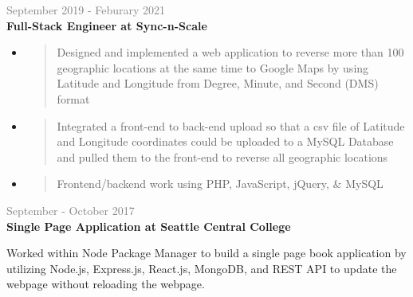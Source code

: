 \documentclass[letterpage]{article}
\begin{document}
\begin{minipage}[t]{0.61\linewidth}
\vspace{7px}
\textcolor{gray}{September 2019 - Feburary 2021}\\
\textbf{\textsf{Full-Stack Engineer at Sync-n-Scale}}
\begin{itemize}[leftmargin=*,labelindent=1mm,labelsep=0mm]
\item
  \begin{quote}
  \raggedright
  Designed and implemented a web application to reverse more than 100 geographic locations at the same time to Google Maps by using Latitude and Longitude from Degree, Minute, and Second (DMS) format
  \end{quote}
\item
  \begin{quote}
  \raggedright
  Integrated a front-end to back-end upload so that a csv file of Latitude and Longitude coordinates could be uploaded to a MySQL Database and pulled them to the front-end to reverse all geographic locations
  \end{quote}
\item
  \begin{quote}
  \raggedright
  Frontend/backend work using PHP, JavaScript, jQuery, \& MySQL
  \end{quote}
\end{itemize}

\vspace{7px}
\textcolor{gray}{September - October 2017}\\
\textbf{\textsf{Single Page Application at Seattle Central College}}\\
\raggedright
Worked within Node Package Manager to build a single page book application by utilizing Node.js,
Express.js, React.js, MongoDB, and REST API to update the webpage without reloading the webpage.


\end{minipage}
\end{document}
